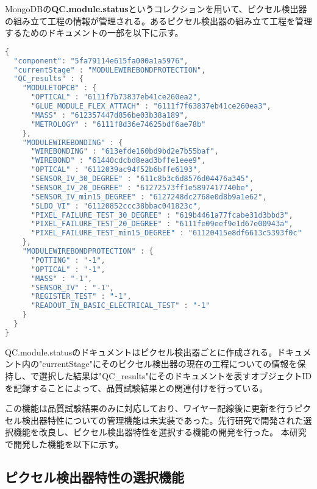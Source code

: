 MongoDBの\textbf{QC.module.status}というコレクションを用いて、ピクセル検出器の組み立て工程の情報が管理される。あるピクセル検出器の組み立て工程を管理するためのドキュメントの一部を以下に示す。
\begin{lstlisting}[caption=ピクセル検出器の組み立て工程を管理するためのドキュメントの一部。,label=fuga, language=C++]
{
  "component": "5fa79114e615fa000a1a5976",
  "currentStage" : "MODULEWIREBONDPROTECTION",
  "QC_results" : {
    "MODULETOPCB" : {
      "OPTICAL" : "6111f7b73837eb41ce260ea2",
      "GLUE_MODULE_FLEX_ATTACH" : "6111f7f63837eb41ce260ea3",
      "MASS" : "612357447d856be03b38a189",
      "METROLOGY" : "6111f8d36e74625bdf6ae78b"
    },
    "MODULEWIREBONDING" : {
      "WIREBONDING" : "613efde160bd9bd2e7b55baf",
      "WIREBOND" : "61440cdcbd8ead3bffe1eee9",
      "OPTICAL" : "6112039ac94f52b6bffe6193",
      "SENSOR_IV_30_DEGREE" : "611c8b3c6d8576d04476a345",
      "SENSOR_IV_20_DEGREE" : "61272573ff1e5897417740be",
      "SENSOR_IV_min15_DEGREE" : "6127248dc2768e0d8b9a1e62",
      "SLDO_VI" : "61120852ccc38bbac041823c",
      "PIXEL_FAILURE_TEST_30_DEGREE" : "619b4461a77fcabe31d3bbd3",
      "PIXEL_FAILURE_TEST_20_DEGREE" : "6111fe09eef9e1d67e00943a",
      "PIXEL_FAILURE_TEST_min15_DEGREE" : "61120415e8df6613c5393f0c"
    },
    "MODULEWIREBONDPROTECTION" : {
      "POTTING" : "-1",
      "OPTICAL" : "-1",
      "MASS" : "-1",
      "SENSOR_IV" : "-1",
      "REGISTER_TEST" : "-1",
      "READOUT_IN_BASIC_ELECTRICAL_TEST" : "-1"
    }
  }
}
\end{lstlisting}

QC.module.statusのドキュメントはピクセル検出器ごとに作成される。ドキュメント内の"currentStage"にそのピクセル検出器の現在の工程についての情報を保持し、で選択した結果は"QC\_results"にそのドキュメントを表すオブジェクトIDを記録することによって、品質試験結果との関連付けを行っている。

この機能は品質試験結果のみに対応しており、ワイヤー配線後に更新を行うピクセル検出器特性についての管理機能は未実装であった。先行研究で開発された選択機能を改良し、ピクセル検出器特性を選択する機能の開発を行った。
本研究で開発した機能を以下に示す。

\subsection{ピクセル検出器特性の選択機能}
\label{sec:prop-sentaku}

